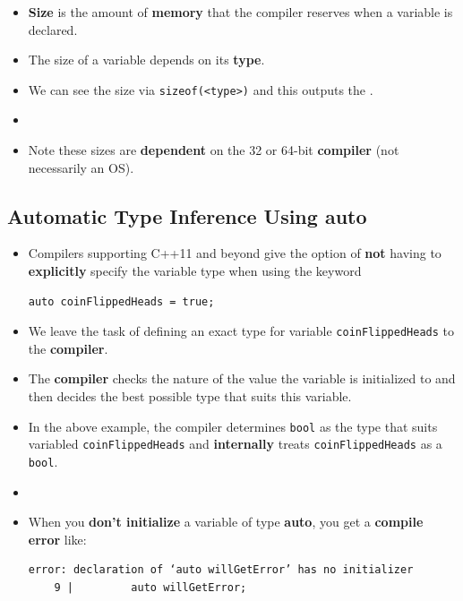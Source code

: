 \documentclass[10pt]{article}
\newcommand{\vocab}[1]{\fbox{\textbf{\textit{#1}}}}
\begin{document}
\begin{itemize}
	\item \textbf{Size} is the amount of \textbf{memory} that the compiler reserves when a variable is declared.
	\item The size of a variable depends on its \textbf{type}.
	\item We can see the size via \verb|sizeof(<type>)| and this outputs the .

	\item {}

\item Note these sizes are \textbf{dependent} on the 32 or 64-bit \textbf{compiler} (not necessarily an OS).
\end{itemize}

\newpage

\subsection{Automatic Type Inference Using auto}
\begin{itemize}
	\item Compilers supporting C++11 and beyond give the option of \textbf{not} having to \textbf{explicitly} specify the variable type when using the keyword \vocab{auto}

		\begin{verbatim}
auto coinFlippedHeads = true;
		\end{verbatim}

	\item We leave the task of defining an exact type for variable \verb|coinFlippedHeads| to the \textbf{compiler}.

	\item The \textbf{compiler} checks the nature of the value the variable is initialized to and then decides the best possible type that suits this variable.

	\item In the above example, the compiler determines \verb|bool| as the type that suits variabled \verb|coinFlippedHeads| and \textbf{internally} treats \verb|coinFlippedHeads| as a \verb|bool|.

	\item {}

	\item When you \textbf{don't initialize} a variable of type \textbf{auto}, you get a \textbf{compile error} like:
		\begin{verbatim}
error: declaration of ‘auto willGetError’ has no initializer
    9 |         auto willGetError;
		\end{verbatim}
\end{itemize}
\end{document}
